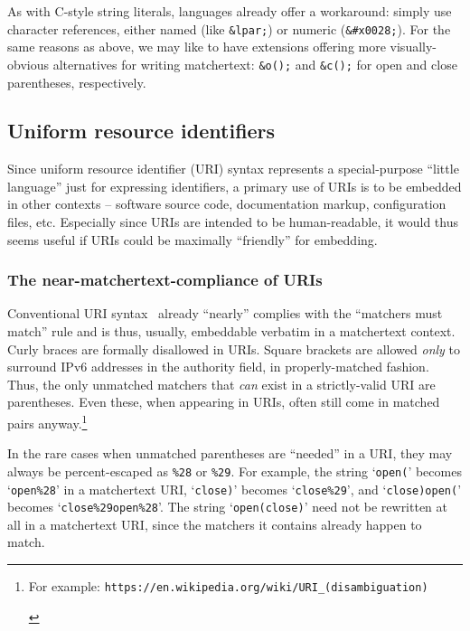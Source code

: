 As with C-style string literals,
\ml languages already offer a workaround:
simply use character references,
either named (like \verb|&lpar;|)
or numeric (\verb|&#x0028;|).
For the same reasons as above,
we may like to have extensions
offering more visually-obvious alternatives for writing matchertext:
\eg \verb|&o();| and \verb|&c();|
for open and close parentheses, 
respectively.


\subsection{Uniform resource identifiers}
\label{sec:embed:uri}

Since uniform resource identifier (URI) syntax represents
a special-purpose ``little language'' just for expressing identifiers,
a primary use of URIs is to be embedded in other contexts --
software source code, documentation markup, configuration files, etc.
Especially since URIs are intended to be human-readable,
it would thus seems useful if URIs
could be maximally ``friendly'' for embedding.

\subsubsection{The near-matchertext-compliance of URIs}

Conventional URI syntax~\cite{rfc3986}
already ``nearly'' complies with the ``matchers must match'' rule
and is thus, usually, embeddable verbatim in a matchertext context.
Curly braces are formally disallowed in URIs.
Square brackets are allowed \emph{only} to surround IPv6 addresses
in the authority field,
in properly-matched fashion.
Thus, the only unmatched matchers that \emph{can} exist
in a strictly-valid URI are parentheses.
Even these, when appearing in URIs,
often still come in matched pairs anyway.\footnote{\begin{tiny}
	For example:
	\texttt{https://en.wikipedia.org/wiki/URI\_(disambiguation)}
	\end{tiny}}

In the rare cases when unmatched parentheses are ``needed'' in a URI,
they may always be percent-escaped as \verb|%28| or \verb|%29|.
For example, the string `\verb|open(|'
becomes `\verb|open%28|' in a matchertext URI,
`\verb|close)|'
becomes `\verb|close%29|',
and `\verb|close)open(|' becomes
`\verb|close%29open%28|'.
The string `\verb|open(close)|'
need not be rewritten at all in a matchertext URI,
since the matchers it contains already happen to match.

